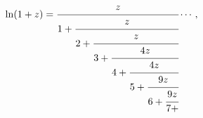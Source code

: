 \[\mathop{\ln\/}\nolimits\!\left(1+z\right)=\cfrac{z}{1+\cfrac{z}{2+\cfrac{z}{3+%
\cfrac{4z}{4+\cfrac{4z}{5+\cfrac{9z}{6+\cfrac{9z}{7+}}}}}}}\cdots,\]